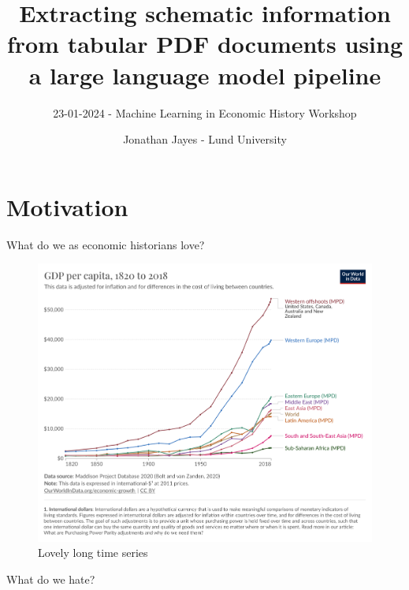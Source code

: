 \documentclass[
  letterpaper,
  DIV=11,
  numbers=noendperiod]{scrartcl}
\title{Extracting schematic information from tabular PDF documents using
a large language model pipeline}
\subtitle{23-01-2024 - Machine Learning in Economic History Workshop}
\author{Jonathan Jayes - Lund University}
\date{}
\begin{document}
\maketitle
\ifdefined\Shaded\renewenvironment{Shaded}{\begin{tcolorbox}[interior hidden, enhanced, boxrule=0pt, borderline west={3pt}{0pt}{shadecolor}, sharp corners, frame hidden, breakable]}{\end{tcolorbox}}\fi

\hypertarget{sec-motivation}{%
\section{Motivation}\label{sec-motivation}}

What do we as economic historians love?

\begin{figure}

{\centering \includegraphics{assets/gdp-per-capita-maddison.png}

}

\caption{Lovely long time series}

\end{figure}

What do we hate?
\end{document}
